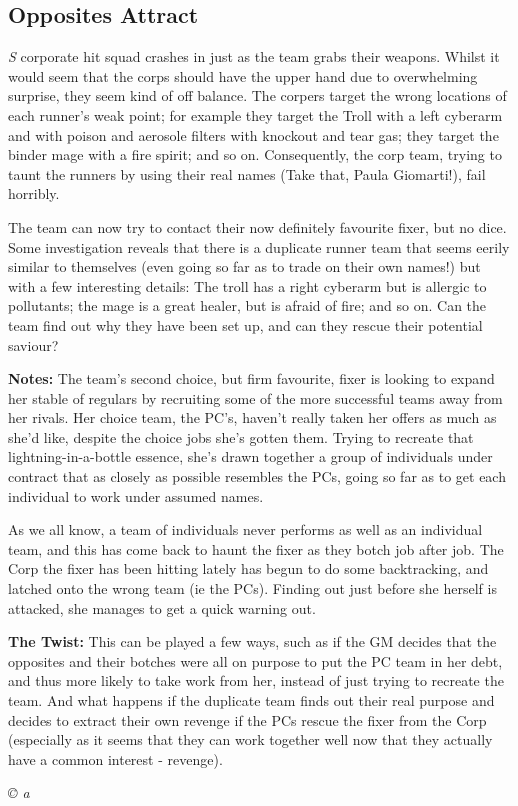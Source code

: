 \documentclass[letterpaper,onecolumn,10pt]{article}
\renewcommand{\textsc}[1]{{\fontspec{Friz Quadrata SC TT}\selectfont #1}}
\newcommand{\getyear}[1]{\StrLeft{#1}{4}}
\newenvironment{scenario}[6]
	{
		\section[#1 {\small\textsc{[#2]}}]{#1} \nopagebreak

		\noindent{\textsc{#2}}\nopagebreak

		\noindent\textit{#3}\nopagebreak
		\def\TMPSCENARIO{{\small\textit{©\getyear{#5}{} #4}}}
	}
	{\TMPSCENARIO}
\newcommand{\synopsis}{\textbf{Synopsis: }}
\newcommand{\notes}{\textbf{Notes: }}
\newcommand{\twist}{\textbf{The Twist: }}
\begin{document}
\begin{multicols}{2}
\begin{scenario}{Opposites Attract}
\synopsis Said corporate hit squad crashes in just as the team grabs their weapons. Whilst it would seem that the corps should have the upper hand due to overwhelming surprise, they seem kind of off balance. The corpers target the wrong locations of each runner's weak point; for example they target the Troll with a left cyberarm and with poison and aerosole filters with knockout and tear gas; they target the binder mage with a fire spirit; and so on. Consequently, the corp team, trying to taunt the runners by using their real names (Take that, Paula Giomarti!), fail horribly.

The team can now try to contact their now definitely favourite fixer, but no dice. Some investigation reveals that there is a duplicate runner team that seems eerily similar to themselves (even going so far as to trade on their own names!) but with a few interesting details: The troll has a right cyberarm but is allergic to pollutants; the mage is a great healer, but is afraid of fire; and so on. Can the team find out why they have been set up, and can they rescue their potential saviour?

\notes The team's second choice, but firm favourite, fixer is looking to expand her stable of regulars by recruiting some of the more successful teams away from her rivals. Her choice team, the PC's, haven't really taken her offers as much as she'd like, despite the choice jobs she's gotten them. Trying to recreate that lightning-in-a-bottle essence, she's drawn together a group of individuals under contract that as closely as possible resembles the PCs, going so far as to get each individual to work under assumed names.

As we all know, a team of individuals never performs as well as an individual team, and this has come back to haunt the fixer as they botch job after job. The Corp the fixer has been hitting lately has begun to do some backtracking, and latched onto the wrong team (ie the PCs). Finding out just before she herself is attacked, she manages to get a quick warning out.

\twist This can be played a few ways, such as if the GM decides that the opposites and their botches were all on purpose to put the PC team in her debt, and thus more likely to take work from her, instead of just trying to recreate the team. And what happens if the duplicate team finds out their real purpose and decides to extract their own revenge if the PCs rescue the fixer from the Corp (especially as it seems that they can work together well now that they actually have a common interest - revenge). 


\end{scenario}
\end{multicols}
\end{document}
